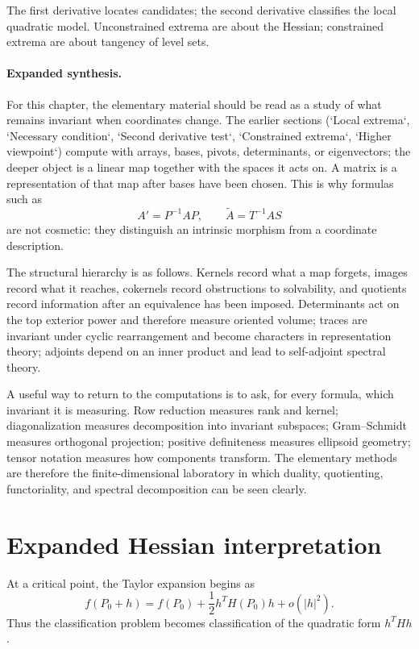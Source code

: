 The first derivative locates candidates; the second derivative classifies the local quadratic model.  Unconstrained extrema are about the Hessian; constrained extrema are about tangency of level sets.



\paragraph{Expanded synthesis.}
For this chapter, the elementary material should be read as a study of what remains invariant when coordinates change. The earlier sections (`Local extrema`, `Necessary condition`, `Second derivative test`, `Constrained extrema`, `Higher viewpoint`) compute with arrays, bases, pivots, determinants, or eigenvectors; the deeper object is a linear map together with the spaces it acts on. A matrix is a representation of that map after bases have been chosen. This is why formulas such as
\[
  A' = P^{-1}AP,\qquad \widetilde A = T^{-1}AS
\]
are not cosmetic: they distinguish an intrinsic morphism from a coordinate description.

The structural hierarchy is as follows. Kernels record what a map forgets, images record what it reaches, cokernels record obstructions to solvability, and quotients record information after an equivalence has been imposed. Determinants act on the top exterior power and therefore measure oriented volume; traces are invariant under cyclic rearrangement and become characters in representation theory; adjoints depend on an inner product and lead to self-adjoint spectral theory.

A useful way to return to the computations is to ask, for every formula, which invariant it is measuring. Row reduction measures rank and kernel; diagonalization measures decomposition into invariant subspaces; Gram--Schmidt measures orthogonal projection; positive definiteness measures ellipsoid geometry; tensor notation measures how components transform. The elementary methods are therefore the finite-dimensional laboratory in which duality, quotienting, functoriality, and spectral decomposition can be seen clearly.


\section{Expanded Hessian interpretation}

At a critical point, the Taylor expansion begins as
\[
  f(P_0+h)=f(P_0)+\frac12 h^T H(P_0)h+o(|h|^2).
\]
Thus the classification problem becomes classification of the quadratic form $h^THh$.

